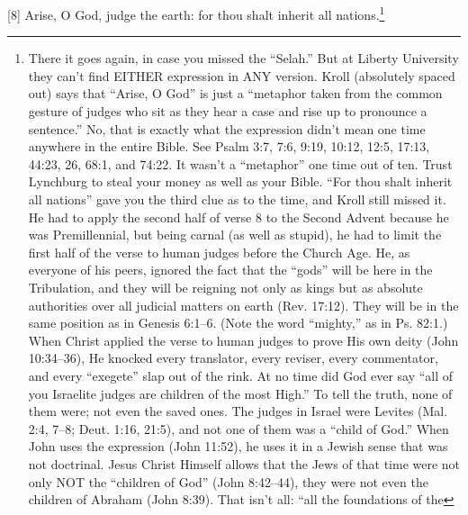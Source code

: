 [8] \textcolor[rgb]{0.00,0.00,1.00}{Arise, O God, judge the earth: for thou shalt inherit all nations.}\footnote{There it goes again, in case you missed the “Selah.” But at Liberty University they can’t find EITHER expression in ANY version. Kroll (absolutely spaced out) says that “Arise, O God” is just a “metaphor taken from the common gesture of judges who sit as they hear a case and rise up to pronounce a sentence.” No, that is exactly what the expression didn’t mean one time anywhere in the entire Bible. See Psalm 3:7, 7:6, 9:19, 10:12, 12:5, 17:13, 44:23, 26, 68:1, and 74:22. It wasn’t a “metaphor” one time out of ten. Trust Lynchburg to steal your money as well as your Bible. “For thou shalt inherit all nations” gave you the third clue as to the time, and Kroll still missed it. He had to apply the second half of verse 8 to the Second Advent because he was Premillennial, but being carnal (as well as stupid), he had to limit the first half of the verse to human judges before the Church Age. He, as everyone of his peers, ignored the fact that the “gods” will be here in the Tribulation, and they will be reigning not only
as kings but as absolute authorities over all
judicial matters on earth (Rev. 17:12). They
will be in the same position as in Genesis 6:1--6. (Note the word “mighty,” as in Ps. 82:1.)
When Christ applied the verse to human
judges to prove His own deity (John 10:34--36), He knocked every translator, every
reviser, every commentator, and every
“exegete” slap out of the rink. At no time did
God ever say “all of you Israelite judges are
children of the most High.” To tell the truth,
none of them were; not even the saved ones.
The judges in Israel were Levites (Mal. 2:4,
7–8; Deut. 1:16, 21:5), and not one of them
was a “child of God.” When John uses the
expression (John 11:52), he uses it in a
Jewish sense that was not doctrinal. Jesus
Christ Himself allows that the Jews of that
time were not only NOT the “children of
God” (John 8:42--44), they were not even the
children of Abraham (John 8:39).
That isn’t all: “all the foundations of the
}
